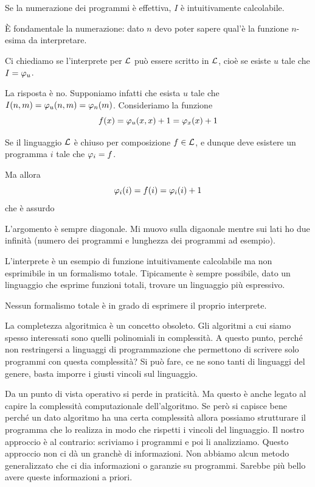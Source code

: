 Se la numerazione dei programmi è effettiva, $I$ è intuitivamente calcolabile.

È fondamentale la numerazione: dato $n$ devo poter sapere qual'è la funzione $n$-esima da interpretare.

Ci chiediamo se l'interprete per $\mathcal{L}$ può essere scritto in $\mathcal{L}$, cioè se esiste $u$ tale
che $I = \varphi_{u}$.

La risposta è no. Supponiamo infatti che esista $u$ tale che $I(n, m) = \varphi_{u}(n, m) = \varphi_{n}(m)$.
Consideriamo la funzione
\begin{equation*}
    f(x) = \varphi_{u}(x,x) + 1 = \varphi_{x}(x)+1
\end{equation*}

Se il linguaggio $\mathcal{L}$ è chiuso per composizione $f \in \mathcal{L}$, e dunque deve esistere un
programma $i$ tale che $\varphi_{i} = f$.

Ma allora
\begin{equation*}
    \varphi_{i}(i) = f(i) = \varphi_{i}(i) + 1
\end{equation*}
che è assurdo

L'argomento è sempre diagonale. Mi muovo sulla digaonale mentre sui lati ho due infinità (numero
dei programmi e lunghezza dei programmi ad esempio).

L'interprete è un esempio di funzione intuitivamente calcolabile ma non esprimibile in un formalismo
totale. Tipicamente è sempre possibile, dato un linguaggio che esprime funzioni totali, trovare un
linguaggio più espressivo.

\begin{thm}
    Nessun formalismo totale è in grado di esprimere il proprio interprete.
\end{thm}

La completezza algoritmica è un concetto obsoleto. Gli algoritmi a cui siamo spesso interessati sono
quelli polinomiali in complessità. A questo punto, perché non restringersi a linguaggi di
programmazione che permettono di scrivere solo programmi con questa complessità? Si può fare, ce ne
sono tanti di linguaggi del genere, basta imporre i giusti vincoli sul linguaggio.

Da un punto di vista operativo si perde in praticità. Ma questo è anche legato al capire la
complessità computazionale dell'algoritmo. Se però si capisce bene perché un dato algoritmo ha
una certa complessità allora possiamo strutturare il programma che lo realizza in modo che rispetti
i vincoli del linguaggio. Il nostro approccio è al contrario: scriviamo i programmi e poi li
analizziamo. Questo approccio non ci dà un granchè di informazioni. Non abbiamo alcun metodo
generalizzato che ci dia informazioni o garanzie su programmi. Sarebbe più bello avere queste
informazioni a priori.

